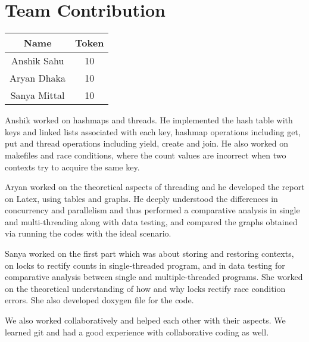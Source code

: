 \documentclass{article}
\begin{document}
\section{Team Contribution}
\begin{center}
\begin{tabular}{|c|c|}
\hline
Name & Token \\
\hline
Anshik Sahu & 10 \\
\hline
Aryan Dhaka & 10 \\
\hline
Sanya Mittal & 10 \\
\hline
\end{tabular}
\end{center}

Anshik worked on hashmaps and threads. He implemented the hash table with keys and linked lists associated with each key, hashmap operations including get, put and thread operations including yield, create and join. He also worked on makefiles and race conditions, where the count values are incorrect when two contexts try to acquire the same key. 

Aryan worked on the theoretical aspects of threading and he developed the report on Latex, using tables and graphs. He deeply understood the differences in concurrency and parallelism and thus performed a comparative analysis in single and multi-threading along with data testing, and compared the graphs obtained via running the codes with the ideal scenario.

Sanya worked on the first part which was about storing and restoring contexts, on locks to rectify counts in single-threaded program, and in data testing for comparative analysis between single and multiple-threaded programs. She worked on the theoretical understanding of how and why locks rectify race condition errors. She also developed doxygen file for the code. 

We also worked collaboratively and helped each other with their aspects. We learned git and had a good experience with collaborative coding as well.
\end{document}
